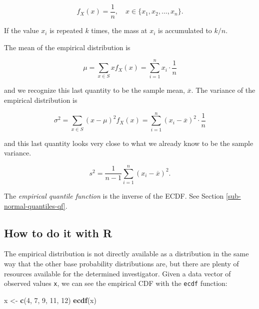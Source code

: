 \documentclass[]{book}
\newenvironment{Shaded}{\begin{snugshade}}{\end{snugshade}}
\newcommand{\KeywordTok}[1]{\textcolor[rgb]{0.13,0.29,0.53}{\textbf{{#1}}}}
\newcommand{\DecValTok}[1]{\textcolor[rgb]{0.00,0.00,0.81}{{#1}}}
\newcommand{\StringTok}[1]{\textcolor[rgb]{0.31,0.60,0.02}{{#1}}}
\newcommand{\NormalTok}[1]{{#1}}
\numberwithin{equation}{chapter}
\numberwithin{figure}{chapter}
\theoremstyle{plain}
\theoremstyle{definition}
\theoremstyle{remark}
\theoremstyle{definition}
\theoremstyle{definition}
\theoremstyle{remark}
\begin{document}
\begin{equation} 
f_{X}(x)=\frac{1}{n},\quad x\in \{ x_{1},x_{2},...,x_{n} \}.
\end{equation}

If the value \(x_{i}\) is repeated \(k\) times, the mass at \(x_{i}\) is
accumulated to \(k/n\).

The mean of the empirical distribution is

\begin{equation}
\mu=\sum_{x\in S}xf_{X}(x)=\sum_{i=1}^{n}x_{i}\cdot\frac{1}{n}
\end{equation}

and we recognize this last quantity to be the sample mean,
\(\overline{x}\). The variance of the empirical distribution is

\begin{equation}
\sigma^{2}=\sum_{x\in S}(x-\mu)^{2}f_{X}(x)=\sum_{i=1}^{n}(x_{i}-\overline{x})^{2}\cdot\frac{1}{n}
\end{equation}

and this last quantity looks very close to what we already know to be
the sample variance.

\begin{equation}
s^{2}=\frac{1}{n-1}\sum_{i=1}^{n}(x_{i}-\overline{x})^{2}.
\end{equation}

The \emph{empirical quantile function} is the inverse of the ECDF. See
Section \ref{sub-normal-quantiles-qf}.

\subsection{How to do it with R}\label{how-to-do-it-with-r-23}

The empirical distribution is not directly available as a distribution
in the same way that the other base probability distributions are, but
there are plenty of resources available for the determined investigator.
Given a data vector of observed values \texttt{x}, we can see the
empirical CDF with the \texttt{ecdf} 
function:

\begin{Shaded}
\begin{Highlighting}[]
\NormalTok{x <-}\StringTok{ }\KeywordTok{c}\NormalTok{(}\DecValTok{4}\NormalTok{, }\DecValTok{7}\NormalTok{, }\DecValTok{9}\NormalTok{, }\DecValTok{11}\NormalTok{, }\DecValTok{12}\NormalTok{)}
\KeywordTok{ecdf}\NormalTok{(x)}
\end{Highlighting}
\end{Shaded}
\end{document}
